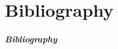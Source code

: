 %
%

\if@mainmatter
\backmatter
\fi

\ifx\bibliocommand\undefined
\else
	\part{Bibliography}
	\begin{frame}[allowframebreaks]
	\frametitle{Bibliography}
	
	\def\newblock{}
	\bibliocommand
	\end{frame}
\fi
